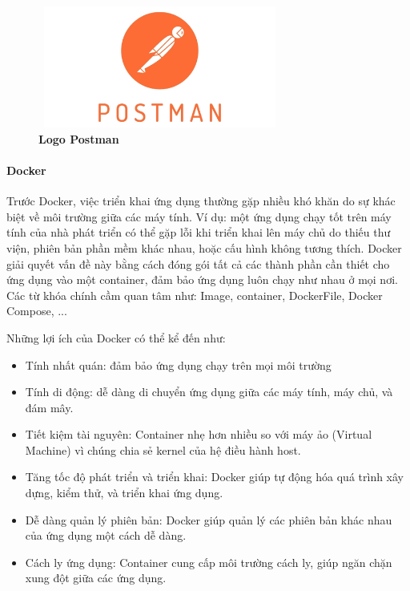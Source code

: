 \begin{figure}[H]
	\centering
	\includegraphics[width=8cm,height=4cm]{Images/Technology/postman.jpg}
	\caption[Logo Postman]{\bfseries \fontsize{12pt}{0pt}
		\selectfont Logo Postman}
	\label{postman} %
\end{figure}


\paragraph{Docker}
\mbox{}

Trước Docker, việc triển khai ứng dụng thường gặp nhiều khó khăn do sự khác biệt về môi trường giữa các máy tính. Ví dụ: một ứng dụng chạy tốt trên máy tính của nhà phát triển có thể gặp lỗi khi triển khai lên máy chủ do thiếu thư viện, phiên bản phần mềm khác nhau, hoặc cấu hình không tương thích. Docker giải quyết vấn đề này bằng cách đóng gói tất cả các thành phần cần thiết cho ứng dụng vào một container, đảm bảo ứng dụng luôn chạy như nhau ở mọi nơi. Các từ khóa chính cầm quan tâm như: Image, container, DockerFile, Docker Compose, ... \cite{docker}

Những lợi ích của Docker có thể kể đến như:
\begin{itemize}
	\item Tính nhất quán: đảm bảo ứng dụng chạy trên mọi môi trường
	\item Tính di động: dễ dàng di chuyển ứng dụng giữa các máy tính, máy chủ, và đám mây.
	\item Tiết kiệm tài nguyên: Container nhẹ hơn nhiều so với máy ảo (Virtual Machine) vì chúng chia sẻ kernel của hệ điều hành host.
	\item Tăng tốc độ phát triển và triển khai: Docker giúp tự động hóa quá trình xây dựng, kiểm thử, và triển khai ứng dụng.
	\item Dễ dàng quản lý phiên bản: Docker giúp quản lý các phiên bản khác nhau của ứng dụng một cách dễ dàng.
	\item Cách ly ứng dụng: Container cung cấp môi trường cách ly, giúp ngăn chặn xung đột giữa các ứng dụng.
\end{itemize}

